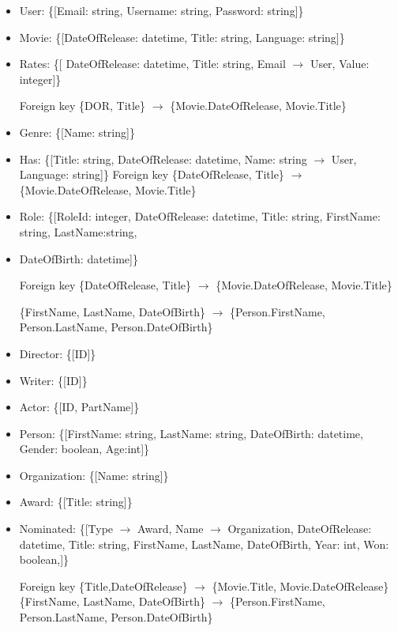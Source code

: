 \begin{itemize}
\item User: \{[Email: string, Username: string, Password: string]\}

\item Movie: \{[DateOfRelease: datetime, Title: string, Language: string]\}

\item Rates: \{[ DateOfRelease: datetime, Title: string, Email $ \rightarrow $ User, Value: integer]\}

Foreign key \{DOR, Title\}  $ \rightarrow $ \{Movie.DateOfRelease, Movie.Title\}

\item Genre: \{[Name: string]\}

\item Has: \{[Title: string, DateOfRelease: datetime, Name: string $ \rightarrow $ User, Language: string]\}
	Foreign key \{DateOfRelease, Title\} $ \rightarrow $ \{Movie.DateOfRelease, Movie.Title\}

\item Role: \{[RoleId: integer, DateOfRelease: datetime, Title: string, FirstName: string, LastName:string,

\item DateOfBirth: datetime]\}

Foreign key \{DateOfRelease, Title\} $ \rightarrow $ \{Movie.DateOfRelease, Movie.Title\}

\{FirstName, LastName, DateOfBirth\} $ \rightarrow $ \{Person.FirstName, Person.LastName, Person.DateOfBirth\}

\item Director: \{[ID]\}

\item Writer: \{[ID]\}

\item Actor: \{[ID, PartName]\}

\item Person: \{[FirstName: string, LastName: string, DateOfBirth: datetime, 
Gender: boolean, Age:int]\}

\item Organization: \{[Name: string]\}

\item Award: \{[Title: string]\}

\item Nominated: \{[Type $ \rightarrow $ Award, Name $ \rightarrow $ Organization, DateOfRelease: datetime, Title: string, FirstName, LastName, DateOfBirth, Year: int, Won: boolean,]\}

Foreign key \{Title,DateOfRelease\} $ \rightarrow $ \{Movie.Title, Movie.DateOfRelease\}
		\{FirstName, LastName, DateOfBirth\} $ \rightarrow $ \{Person.FirstName, Person.LastName, 
Person.DateOfBirth\}
\end{itemize}


